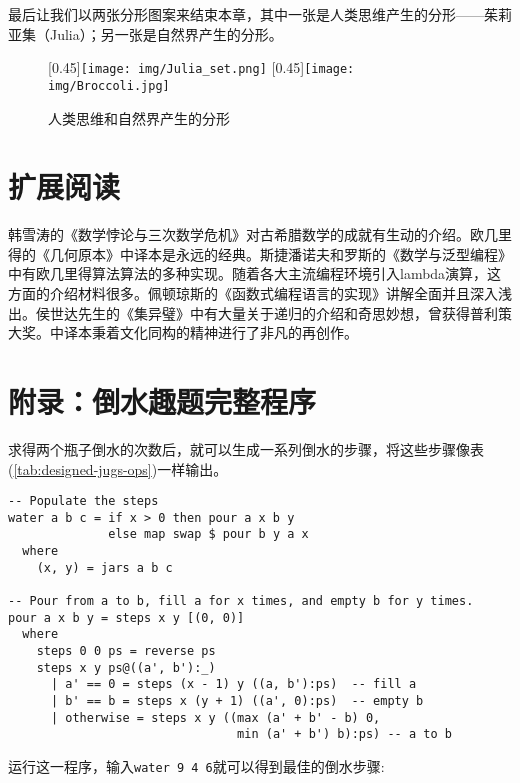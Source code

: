 \documentclass[UTF8]{article}
\begin{document}
最后让我们以两张分形图案来结束本章，其中一张是人类思维产生的分形——茱莉亚集（Julia）；另一张是自然界产生的分形。

\begin{figure}[htbp]
 \centering
 [0.45\linewidth]{\texttt{[image: img/Julia\_set.png]}}
 [0.45\linewidth]{\texttt{[image: img/Broccoli.jpg]}}
 \caption{人类思维和自然界产生的分形}
 \label{fig:more-fractal}
\end{figure}

\section{扩展阅读}

韩雪涛的《数学悖论与三次数学危机》\cite{HanXueTao16}对古希腊数学的成就有生动的介绍。欧几里得的《几何原本》中译本\cite{Elements}是永远的经典。斯捷潘诺夫和罗斯的《数学与泛型编程》\cite{StepanovRose15}中有欧几里得算法算法的多种实现。随着各大主流编程环境引入lambda演算，这方面的介绍材料很多。佩顿琼斯的《函数式编程语言的实现》\cite{SPJ1987}讲解全面并且深入浅出。侯世达先生的《集异璧》\cite{GEB}中有大量关于递归的介绍和奇思妙想，曾获得普利策大奖。中译本秉着文化同构的精神进行了非凡的再创作。

\section{附录：倒水趣题完整程序}

求得两个瓶子倒水的次数后，就可以生成一系列倒水的步骤，将这些步骤像表(\ref{tab:designed-jugs-ops})一样输出。

\lstset{frame=single}
\begin{lstlisting}
-- Populate the steps
water a b c = if x > 0 then pour a x b y
              else map swap $ pour b y a x
  where
    (x, y) = jars a b c

-- Pour from a to b, fill a for x times, and empty b for y times.
pour a x b y = steps x y [(0, 0)]
  where
    steps 0 0 ps = reverse ps
    steps x y ps@((a', b'):_)
      | a' == 0 = steps (x - 1) y ((a, b'):ps)  -- fill a
      | b' == b = steps x (y + 1) ((a', 0):ps)  -- empty b
      | otherwise = steps x y ((max (a' + b' - b) 0,
                                min (a' + b') b):ps) -- a to b
\end{lstlisting}

运行这一程序，输入\texttt{water 9 4 6}就可以得到最佳的倒水步骤:
\end{document}
